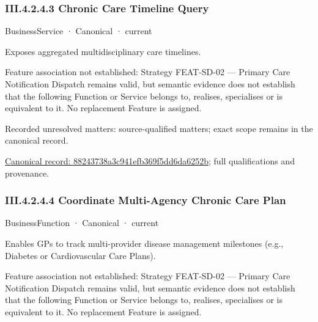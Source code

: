 \subsubsection*{III.4.2.4.3 Chronic Care Timeline Query}
\label{navigation:III.4.2.4.3}

\label{element:88243738a3c941efb369f5dd6da6252b}
{\small BusinessService · Canonical · current}\par

Exposes aggregated multidisciplinary care timelines.



Feature association not established: Strategy FEAT-SD-02 — Primary Care Notification Dispatch remains valid, but semantic evidence does not establish that the following Function or Service belongs to, realises, specialises or is equivalent to it. No replacement Feature is assigned.


{\small Recorded unresolved matters: source-qualified matters; exact scope remains in the canonical record.}\par
{\footnotesize \href{../../../../../../../../continuum/business/business-service/88243738a3c941efb369f5dd6da6252b.md}{Canonical record: 88243738a3c941efb369f5dd6da6252b}; full qualifications and provenance.}\par
\subsubsection*{III.4.2.4.4 Coordinate Multi-Agency Chronic Care Plan}
\label{navigation:III.4.2.4.4}

\label{element:fc49b716c2a845408198591e9a4dc515}
{\small BusinessFunction · Canonical · current}\par

Enables GPs to track multi-provider disease management milestones (e.g., Diabetes or Cardiovascular Care Plans).



Feature association not established: Strategy FEAT-SD-02 — Primary Care Notification Dispatch remains valid, but semantic evidence does not establish that the following Function or Service belongs to, realises, specialises or is equivalent to it. No replacement Feature is assigned.


